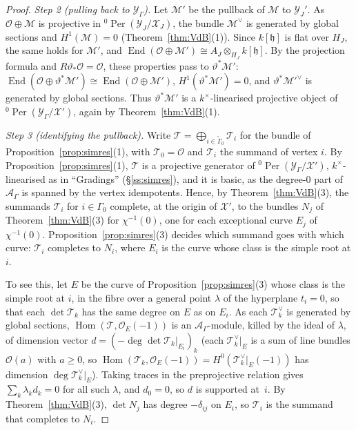 \documentclass[11pt]{amsart}
\numberwithin{table}{section}
\numberwithin{figure}{section}
\numberwithin{equation}{section}
\theoremstyle{definition}
\theoremstyle{plain}
\newcommand{\cA}{\mathcal{A}}
\newcommand{\cO}{\mathcal{O}}
\newcommand{\cX}{\mathcal{X}}
\newcommand{\cY}{\mathcal{Y}}
\newcommand{\h}{\mathfrak{h}}
\newcommand{\tGamma}{\widetilde{\Gamma}}
\DeclareMathOperator{\End}{End}
\DeclareMathOperator{\Hom}{Hom}
\DeclareMathOperator{\Per}{Per}
\begin{document}
\begin{proof}
\emph{Step 2 (pulling back to $\cY_\Gamma$).} Let $\mathcal M'$ be the pullback of $\mathcal M$ to $\cY_J'$. As $\cO \oplus \mathcal M$ is projective in ${}^0\Per(\cY_J/\cX_J)$, the bundle $\mathcal M^\vee$ is generated by global sections and $H^1(\mathcal M) = 0$ (Theorem~\ref{thm:VdB}(1)). Since $k[\h]$ is flat over $H_J$, the same holds for $\mathcal M'$, and $\End(\cO \oplus \mathcal M') \cong A_J \otimes_{H_J} k[\h]$. By the projection formula and $R\vartheta_*\cO = \cO$, these properties pass to $\vartheta^*\mathcal M'$: $\End(\cO \oplus \vartheta^*\mathcal M') \cong \End(\cO \oplus \mathcal M')$, $H^1(\vartheta^*\mathcal M') = 0$, and $\vartheta^*\mathcal M'^\vee$ is generated by global sections. Thus $\vartheta^*\mathcal M'$ is a $k^\times$-linearised projective object of ${}^0\Per(\cY_\Gamma/\cX')$, again by Theorem~\ref{thm:VdB}(1).

\emph{Step 3 (identifying the pullback).} Write $\mathcal T = \bigoplus_{i \in \tGamma_0} \mathcal T_i$ for the bundle of Proposition~\ref{prop:simres}(1), with $\mathcal T_0 = \cO$ and $\mathcal T_i$ the summand of vertex $i$. By Proposition~\ref{prop:simres}(1), $\mathcal T$ is a projective generator of ${}^0\Per(\cY_\Gamma/\cX')$, $k^\times$-linearised as in ``Gradings'' (\S\ref{ss:simres}), and it is basic, as the degree-$0$ part of $\cA_\Gamma$ is spanned by the vertex idempotents. Hence, by Theorem~\ref{thm:VdB}(3), the summands $\mathcal T_i$ for $i \in \Gamma_0$ complete, at the origin of $\cX'$, to the bundles $N_j$ of Theorem~\ref{thm:VdB}(3) for $\chi^{-1}(0)$, one for each exceptional curve $E_j$ of $\chi^{-1}(0)$. Proposition~\ref{prop:simres}(3) decides which summand goes with which curve: $\mathcal T_i$ completes to $N_i$, where $E_i$ is the curve whose class is the simple root at $i$.

To see this, let $E$ be the curve of Proposition~\ref{prop:simres}(3) whose class is the simple root at $i$, in the fibre over a general point $\lambda$ of the hyperplane $t_i = 0$, so that each $\det \mathcal T_k$ has the same degree on $E$ as on $E_i$. As each $\mathcal T_k^\vee$ is generated by global sections, $\Hom(\mathcal T, \cO_E(-1))$ is an $\cA_\Gamma$-module, killed by the ideal of $\lambda$, of dimension vector $d = (-\deg \det \mathcal T_k|_{E_i})_k$ (each $\mathcal T_k^\vee|_E$ is a sum of line bundles $\cO(a)$ with $a \ge 0$, so $\Hom(\mathcal T_k, \cO_E(-1)) = H^0(\mathcal T_k^\vee|_E(-1))$ has dimension $\deg \mathcal T_k^\vee|_E$). Taking traces in the preprojective relation gives $\sum_k \lambda_k d_k = 0$ for all such $\lambda$, and $d_0 = 0$, so $d$ is supported at~$i$. By Theorem~\ref{thm:VdB}(3), $\det N_j$ has degree $-\delta_{ij}$ on $E_i$, so $\mathcal T_i$ is the summand that completes to $N_i$.


\end{proof}
\end{document}
